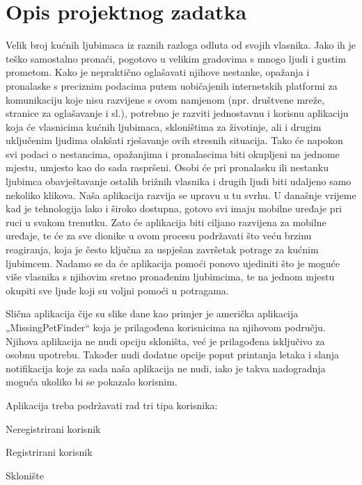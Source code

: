 \chapter{Opis projektnog zadatka}
		
		Velik broj kućnih ljubimaca iz raznih razloga odluta od svojih vlasnika. Jako ih je teško samostalno pronaći, pogotovo u velikim gradovima s mnogo ljudi i gustim prometom. Kako je nepraktično oglašavati njihove nestanke, opažanja i pronalaske s preciznim podacima putem uobičajenih internetskih platformi za komunikaciju koje nisu razvijene s ovom namjenom (npr. društvene mreže, stranice za oglašavanje i sl.), potrebno je razviti jednostavnu i korisnu aplikaciju koja će vlasnicima kućnih ljubimaca, skloništima za životinje, ali i drugim uključenim ljudima olakšati rješavanje ovih stresnih situacija. Tako će napokon svi podaci o nestancima, opažanjima i pronalascima biti okupljeni na jednome mjestu, umjesto kao do sada raspršeni. Osobi će pri pronalasku ili nestanku ljubimca obavještavanje ostalih brižnih vlasnika i drugih ljudi biti udaljeno samo nekoliko klikova. Naša aplikacija razvija se upravu u tu svrhu. U današnje vrijeme kad je tehnologija lako i široko dostupna, gotovo svi imaju mobilne uređaje pri ruci u svakom trenutku. Zato će aplikacija biti ciljano razvijena za mobilne uređaje, te će za sve dionike u ovom procesu podržavati što veću brzinu reagiranja, koja je često ključna za uspješan završetak potrage za kućnim ljubimcem. Nadamo se da će aplikacija pomoći ponovo ujediniti što je moguće više vlasnika s njihovim sretno pronađenim ljubimcima, te na jednom mjestu okupiti sve ljude koji su voljni pomoći u potragama. 

Slična aplikacija čije su slike dane kao primjer je američka aplikacija „MissingPetFinder“ koja je prilagođena korisnicima na njihovom području.  Njihova aplikacija ne nudi opciju skloništa, već je prilagođena isključivo za osobnu upotrebu. Također nudi dodatne opcije poput printanja letaka i slanja notifikacija koje za sada naša aplikacija ne nudi, iako je takva nadogradnja moguća ukoliko bi se pokazalo korisnim.

Aplikacija treba podržavati rad tri tipa korisnika:

		\begin{packed_item}
			
			\item  Neregistrirani korisnik
			\item  Registrirani korisnik
			\item  Sklonište
			
		\end{packed_item}

